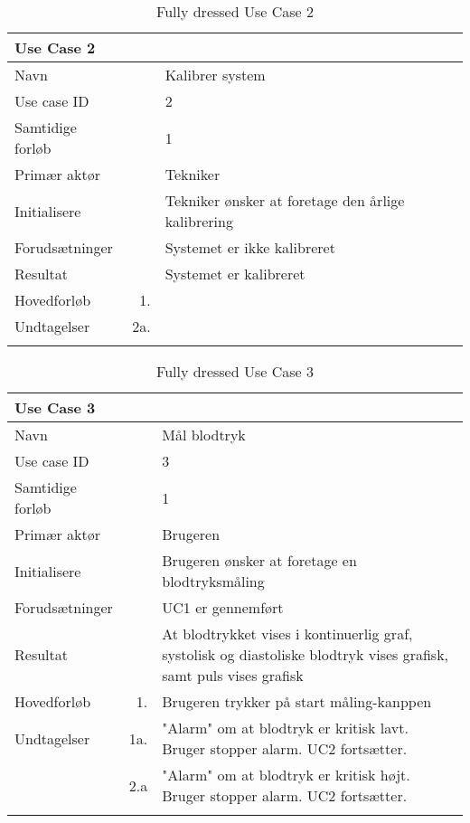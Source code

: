 \begin{longtabu} to  %
    {\large \textbf{Use Case 2}} && \\
    \toprule
    Navn &&    Kalibrer system\\
    Use case ID &&    2\\
    Samtidige forløb &&    1\\
    Primær aktør &&    Tekniker\\
    Initialisere &&    Tekniker ønsker at foretage den årlige kalibrering\\
    Forudsætninger && Systemet er ikke kalibreret \\
    Resultat &&    Systemet er kalibreret                     \\ \midrule
    Hovedforløb &    1. &      \\ \midrule
                
    Undtagelser &    2a. &    \\ \bottomrule
\caption{Fully dressed Use Case 2}
\label{UC2}
\end{longtabu}

\begin{longtabu} to  %
    {\large \textbf{Use Case 3}} && \\
    \toprule
    Navn &&    Mål blodtryk\\
    Use case ID &&    3\\
    Samtidige forløb &&    1\\
    Primær aktør &&    Brugeren\\
    Initialisere &&    Brugeren ønsker at foretage en blodtryksmåling\\
    Forudsætninger && UC1 er gennemført\\
    Resultat &&    At blodtrykket vises i kontinuerlig graf, systolisk og diastoliske blodtryk vises grafisk, samt puls vises grafisk                     \\ \midrule
    Hovedforløb &    1. &    Brugeren trykker på start måling\--kanppen  \\ \midrule
                
    Undtagelser &    1a. & "Alarm" om at blodtryk er kritisk lavt. Bruger stopper alarm. UC2 fortsætter. \\  & 2.a & "Alarm" om at blodtryk er kritisk højt. Bruger stopper alarm. UC2 fortsætter. \\ \bottomrule
\caption{Fully dressed Use Case 3}
\label{UC3}
\end{longtabu}

